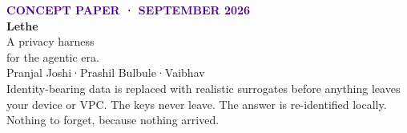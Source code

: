 \documentclass[aspectratio=169,10pt]{beamer}
\newcommand{\eyebrow}[1]{{\fontsize{6}{7.5}\selectfont\bfseries\textcolor{indigo}{\MakeUppercase{#1}}}}
\begin{document}
\begin{frame}[plain]
\vspace{13mm}\hspace{10mm}\begin{minipage}{0.56\textwidth}\relax
\eyebrow{Concept paper · September 2026}\\[8pt]
{\fontsize{34}{36}\selectfont\bfseries\color{ink}Lethe}\\[4pt]
{\fontsize{14}{17}\selectfont\color{ink!80}A privacy harness\\for the agentic era.}\\[8pt]
{\fontsize{9}{12}\selectfont\color{ink!65}Pranjal Joshi\quad·\quad Prashil Bulbule\quad·\quad Vaibhav}\\[10pt]
{\footnotesize\color{ink!75}Identity-bearing data is replaced with realistic surrogates before anything leaves your device or VPC. The keys never leave. The answer is re-identified locally. Nothing to forget, because nothing arrived.}
\end{minipage}\hfill
\begin{minipage}{0.32\textwidth}\centering
{}
\end{minipage}
\end{frame}
\end{document}
